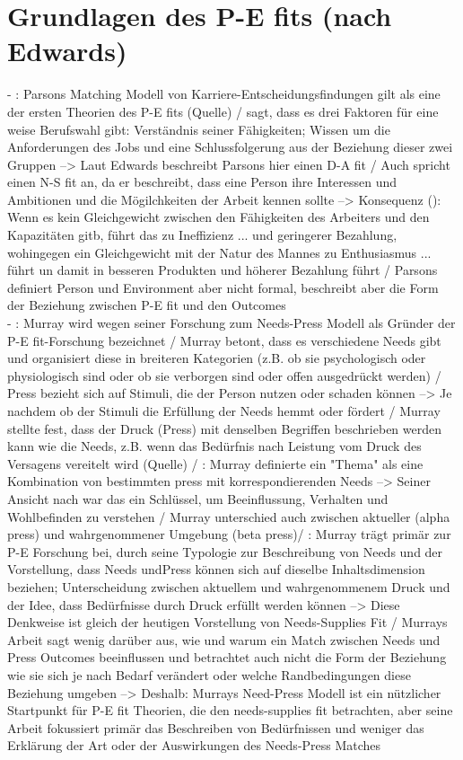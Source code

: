 \section{Grundlagen des P-E fits (nach Edwards)}
\label{ch:notizen:grundlagen}
- \cite[S. 6f.]{edwards:2008}: Parsons Matching Modell von Karriere-Entscheidungsfindungen gilt als eine der ersten Theorien des P-E fits (Quelle) / \textcite[S. 5]{parsons:1909} sagt, dass es drei Faktoren für eine weise Berufswahl gibt: Verständnis seiner Fähigkeiten; Wissen um die Anforderungen des Jobs und eine Schlussfolgerung aus der Beziehung dieser zwei Gruppen --> Laut Edwards beschreibt Parsons hier einen D-A fit / Auch spricht \textcite{parsons:1909} einen N-S fit an, da er beschreibt, dass eine Person ihre Interessen und Ambitionen und die Mögilchkeiten der Arbeit kennen sollte --> Konsequenz (\cite[S. 3]{parsons:1909}): Wenn es kein Gleichgewicht zwischen den Fähigkeiten des Arbeiters und den Kapazitäten gitb, führt das zu Ineffizienz ... und geringerer Bezahlung, wohingegen ein Gleichgewicht mit der Natur des Mannes zu Enthusiasmus ... führt un damit in besseren Produkten und höherer Bezahlung führt / Parsons definiert Person und Environment aber nicht formal, beschreibt aber die Form der Beziehung zwischen P-E fit und den Outcomes \\
- \cite[S. 7]{edwards:2008}: Murray wird wegen seiner Forschung zum Needs-Press Modell als Gründer der P-E fit-Forschung bezeichnet / Murray betont, dass es verschiedene Needs gibt und organisiert diese in breiteren Kategorien (z.B. ob sie psychologisch oder physiologisch sind oder ob sie verborgen sind oder offen ausgedrückt werden) / Press bezieht sich auf Stimuli, die der Person nutzen oder schaden können --> Je nachdem ob der Stimuli die Erfüllung der Needs hemmt oder fördert / Murray stellte fest, dass der Druck (Press) mit denselben Begriffen beschrieben werden kann wie die Needs, z.B. wenn das Bedürfnis nach Leistung vom Druck des Versagens vereitelt wird (Quelle) / \cite[S. 7f.]{edwards:2008}: Murray definierte ein "Thema" als eine Kombination von bestimmten press mit korrespondierenden Needs --> Seiner Ansicht nach war das ein Schlüssel, um Beeinflussung, Verhalten und Wohlbefinden zu verstehen / Murray unterschied auch zwischen aktueller (alpha press) und wahrgenommener Umgebung (beta press)/ \cite[S. 8]{edwards:2008}: Murray trägt primär zur P-E Forschung bei, durch seine Typologie zur Beschreibung von Needs und der Vorstellung, dass Needs undPress können sich auf dieselbe Inhaltsdimension beziehen; Unterscheidung zwischen aktuellem und wahrgenommenem Druck und der Idee, dass Bedürfnisse durch Druck erfüllt werden können --> Diese Denkweise ist gleich der heutigen Vorstellung von Needs-Supplies Fit / Murrays Arbeit sagt wenig darüber aus, wie und warum ein Match zwischen Needs und Press Outcomes beeinflussen und betrachtet auch nicht die Form der Beziehung wie sie sich je nach Bedarf verändert oder welche Randbedingungen diese Beziehung umgeben --> Deshalb: Murrays Need-Press Modell ist ein nützlicher Startpunkt für P-E fit Theorien, die den needs-supplies fit betrachten, aber seine Arbeit fokussiert primär das Beschreiben von Bedürfnissen und weniger das Erklärung der Art oder der Auswirkungen des Needs-Press Matches \\
